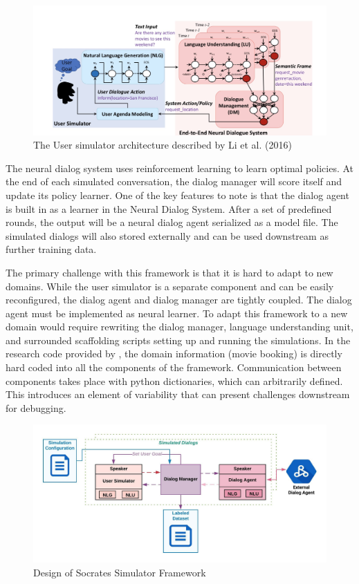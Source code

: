 \begin{figure}[h!]
	\label{fig:li_end_end}
	\includegraphics[width=\linewidth]{diagrams/li_end_to_end.jpeg}
	\caption{ The User simulator architecture described by Li et al. (2016) }
\end{figure}

The neural dialog system uses reinforcement learning to learn optimal policies. At the end of each simulated conversation, the dialog manager will score itself and update its policy learner. One of the key features to note is that the dialog agent is built in as a learner in the Neural Dialog System. After a set of predefined rounds, the output will be a neural dialog agent serialized as a model file. The simulated dialogs will also stored externally and can be used downstream as further training data.

The primary challenge with this framework is that it is hard to adapt to new domains. While the user simulator is a separate component and can be easily reconfigured, the dialog agent and dialog manager are tightly coupled. The dialog agent must be implemented as neural learner. To adapt this framework to a new domain would require rewriting the dialog manager, language understanding unit, and surrounded scaffolding scripts setting up and running the simulations. In the research code provided by \cite{li_end_to_end}, the domain information (movie booking) is directly hard coded into all the components of the framework. Communication between components takes place with python dictionaries, which can arbitrarily defined. This introduces an element of variability that can present challenges downstream for debugging.

\begin{figure}[h!]
	\label{fig:socrates_sim_framework}
	\includegraphics[width=\linewidth]{diagrams/socrates_diagram.jpeg}
	\caption{ Design of Socrates Simulator Framework }
\end{figure}

